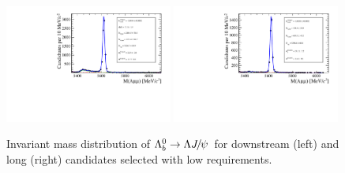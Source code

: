 \begin{figure}
\centering
\includegraphics[width=0.49\textwidth]{Lmumu/figs/MassFits/Lb2JpsiL__lowSel_DD_data.pdf}
\includegraphics[width=0.49\textwidth]{Lmumu/figs/MassFits/Lb2JpsiL__lowSel_LL_data.pdf}
\caption{Invariant mass distribution of $\Lb\ra\Lz\jpsi$ for downstream (left) and long (right) candidates
 selected with low \qsq requirements.}
\label{fig:Lb_totalFit_low}
\end{figure}
%
%
